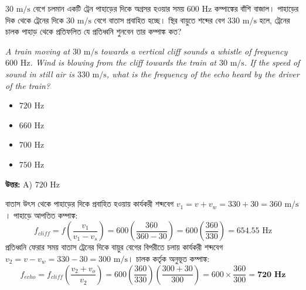 \documentclass[12pt, a4paper]{article}
\begin{document}
\newpage
\begin{tcolorbox}[questionbox={প্রশ্ন (Question) 1}]
    \noindent
    $30\text{ m/s}$ বেগে চলমান একটি ট্রেন পাহাড়ের দিকে অগ্রসর হওয়ার সময় $600\text{ Hz}$ কম্পাঙ্কের বাঁশি বাজাল। পাহাড়ের দিক থেকে ট্রেনের দিকে $30\text{ m/s}$ বেগে বাতাস প্রবাহিত হচ্ছে। স্থির বায়ুতে শব্দের বেগ $330\text{ m/s}$ হলে, ট্রেনের চালক পাহাড় থেকে প্রতিফলিত যে প্রতিধ্বনি শুনবেন তার কম্পাঙ্ক কত?
    
    \vspace{0.8em}
    \begin{english}
    \noindent\textit{\color{darkgray}
    A train moving at $30\text{ m/s}$ towards a vertical cliff sounds a whistle of frequency $600\text{ Hz}$. Wind is blowing from the cliff towards the train at $30\text{ m/s}$. If the speed of sound in still air is $330\text{ m/s}$, what is the frequency of the echo heard by the driver of the train?
    }
    \end{english}
\end{tcolorbox}

\begin{itemize}[label={}, leftmargin=1cm, itemsep=0.5em]
    \item[\textbf{A)}] $720\text{ Hz}$
    \item[\textbf{B)}] $660\text{ Hz}$
    \item[\textbf{C)}] $700\text{ Hz}$
    \item[\textbf{D)}] $750\text{ Hz}$
\end{itemize}

\vspace{0.5em}
\begin{tcolorbox}[answerbox]
    \textbf{\color{success} উত্তর:} A) $720\text{ Hz}$
\end{tcolorbox}
\vspace{1em}

\begin{tcolorbox}[solutionbox={সমাধান (Solution)}]
    \noindent
    বাতাস উৎস থেকে পাহাড়ের দিকে প্রবাহিত হওয়ায় কার্যকরী শব্দবেগ $v_1 = v + v_w = 330 + 30 = 360\text{ m/s}$। পাহাড়ে আপতিত কম্পাঙ্ক:
    \[ f_{cliff} = f \left(\frac{v_1}{v_1 - v_s}\right) = 600 \left(\frac{360}{360 - 30}\right) = 600 \left(\frac{360}{330}\right) = 654.55\text{ Hz} \]
    প্রতিধ্বনি ফেরার সময় বাতাস ট্রেনের দিকে বায়ুর বেগের বিপরীতে চলায় কার্যকরী শব্দবেগ $v_2 = v - v_w = 330 - 30 = 300\text{ m/s}$। চালক কর্তৃক অনুভূত কম্পাঙ্ক:
    \[ f_{echo} = f_{cliff} \left(\frac{v_2 + v_o}{v_2}\right) = 600 \left(\frac{360}{330}\right) \left(\frac{300 + 30}{300}\right) = 600 \times \frac{360}{300} = \mathbf{720\text{ Hz}} \]
\end{tcolorbox}
\end{document}
